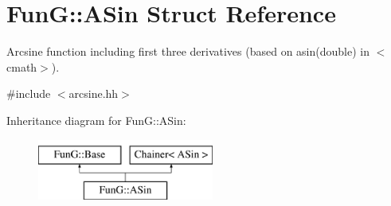 \hypertarget{structFunG_1_1ASin}{}\section{Fun\+G\+:\+:A\+Sin Struct Reference}
\label{structFunG_1_1ASin}


Arcsine function including first three derivatives (based on asin(double) in $<$cmath$>$).  




{\ttfamily \#include $<$arcsine.\+hh$>$}

Inheritance diagram for Fun\+G\+:\+:A\+Sin\+:\begin{figure}[H]
\begin{center}
\leavevmode
\includegraphics[height=2.000000cm]{structFunG_1_1ASin}
\end{center}
\end{figure}
